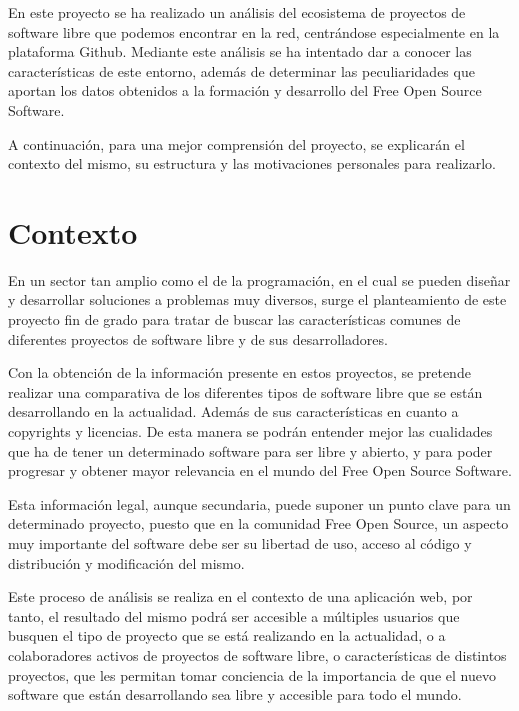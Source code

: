 \documentclass[a4paper, spanish, 12pt]{book}
\begin{document}
En este proyecto se ha realizado un an\'alisis del ecosistema de proyectos de
software libre que podemos encontrar en la red, centr\'andose especialmente en
la plataforma Github. Mediante este an\'alisis se ha intentado dar a conocer las
caracter\'isticas de este entorno, adem\'as de determinar las peculiaridades que
aportan los datos obtenidos a la formaci\'on y desarrollo del Free Open Source Software.

A continuaci\'on, para una mejor comprensi\'on del proyecto, se explicar\'an el
contexto del mismo, su estructura y las motivaciones personales para realizarlo.

\section{Contexto}
\label{sec:contexto}

En un sector tan amplio como el de la programaci\'on, en el cual se pueden dise\~nar
y desarrollar soluciones a problemas muy diversos, surge el planteamiento de este
proyecto fin de grado para tratar de buscar las caracter\'isticas comunes de
diferentes proyectos de software libre y de sus desarrolladores.

Con la obtenci\'on de la informaci\'on presente en estos proyectos, se pretende
realizar una comparativa de los diferentes tipos de software libre que se est\'an
desarrollando en la actualidad. Adem\'as de sus caracter\'isticas en cuanto a
copyrights y licencias. De esta manera se podr\'an entender mejor las cualidades
que ha de tener un determinado software para ser libre y abierto, y para poder
progresar y obtener mayor relevancia en el mundo del Free Open Source Software.

Esta informaci\'on legal, aunque secundaria, puede suponer un punto clave para
un determinado proyecto, puesto que en la comunidad Free Open Source, un aspecto
muy importante del software debe ser su libertad de uso, acceso al c\'odigo y distribuci\'on
y modificaci\'on del mismo.

Este proceso de an\'alisis se realiza en el contexto de una aplicaci\'on
web, por tanto, el resultado del mismo podr\'a ser accesible a m\'ultiples usuarios
que busquen el tipo de proyecto que se est\'a realizando en la actualidad, o a
colaboradores activos de proyectos de software libre, o caracter\'isticas de distintos
proyectos, que les permitan tomar conciencia de la importancia de que el nuevo software
que est\'an desarrollando sea libre y accesible para todo el mundo.
\end{document}
